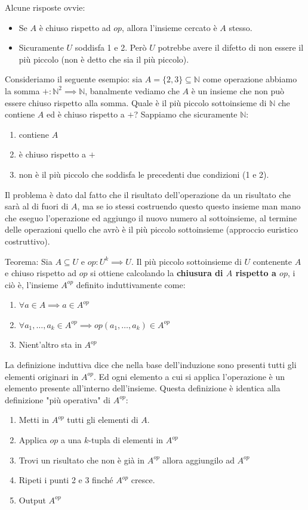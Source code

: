 \documentclass{article}
\begin{document}
Alcune risposte ovvie:
\begin{itemize}
    \item Se $A$ è chiuso rispetto ad $op$, allora l'insieme cercato è $A$ stesso.
    \item Sicuramente $U$ soddisfa 1 e 2. Però $U$ potrebbe avere il difetto di non
          essere il più piccolo (non è detto che sia il più piccolo).
\end{itemize}
Consideriamo il seguente esempio: sia $A=\{2,3\}\subseteq\mathbb{N}$ come operazione
abbiamo la somma $+:\mathbb{N}^2\implies\mathbb{N}$, banalmente vediamo che $A$ è un insieme
che non può essere chiuso rispetto alla somma. Quale è il più piccolo sottoinsieme di $\mathbb{N}$
che contiene $A$ ed è chiuso rispetto a $+$?
Sappiamo che sicuramente $\mathbb{N}$:
\begin{enumerate}
    \item contiene $A$
    \item è chiuso rispetto a $+$
    \item non è il più piccolo che soddisfa le precedenti due condizioni (1 e 2).
\end{enumerate}
Il problema è dato dal fatto che il risultato dell'operazione da un risultato che sarà
al di fuori di $A$, ma se io stessi costruendo questo questo insieme man mano che eseguo
l'operazione ed aggiungo il nuovo numero al sottoinsieme, al termine delle operazioni quello
che avrò è il più piccolo sottoinsieme (approccio euristico costruttivo).

Teorema: Sia $A\subseteq U$ e $op:U^k\implies U$. Il più piccolo sottoinsieme di $U$
contenente $A$ e chiuso rispetto ad $op$ si ottiene calcolando la \textbf{chiusura di $A$
    rispetto a $op$}, i ciò è, l'insieme $A^{op}$ definito induttivamente come:
\begin{enumerate}
    \item $\forall a\in A\implies a\in A^{op}$
    \item $\forall a_1,\dots,a_k\in A^{op}\implies op(a_1,\dots,a_k)\in A^{op}$
    \item Nient'altro sta in $A^{op}$
\end{enumerate}
La definizione induttiva dice che nella base dell'induzione sono presenti tutti gli elementi
originari in $A^{op}$. Ed ogni elemento a cui si applica l'operazione è un elemento
presente all'interno dell'insieme. Questa definizione è identica alla definizione "più
operativa" di $A^{op}$:
\begin{enumerate}
    \item Metti in $A^{op}$ tutti gli elementi di $A$.
    \item Applica $op$ a una $k$-tupla di elementi in $A^{op}$
    \item Trovi un risultato che non è già in $A^{op}$ allora
          aggiungilo ad $A^{op}$
    \item Ripeti i punti 2 e 3 finché $A^{op}$ cresce.
    \item Output $A^{op}$
\end{enumerate}
\end{document}
